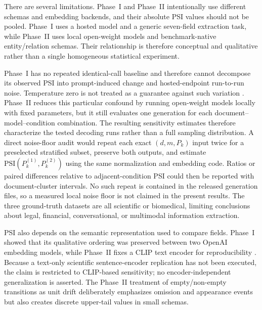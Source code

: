 \documentclass[fleqn,10pt]{wlscirep-authoryear}
\begin{document}
There are several limitations. Phase~I and Phase~II intentionally use different
schemas and embedding backends, and their absolute PSI values should not be pooled.
Phase~I uses a hosted model and a generic seven-field extraction task, while
Phase~II uses local open-weight models and benchmark-native entity/relation
schemas. Their relationship is therefore conceptual and qualitative rather than a
single homogeneous statistical experiment.

Phase~I has no repeated identical-call baseline and therefore cannot decompose its
observed PSI into prompt-induced change and hosted-endpoint run-to-run noise.
Temperature zero is not treated as a guarantee against such variation
\cite{atil2025nondeterminism}. Phase~II reduces this particular confound by
running open-weight models locally with fixed parameters, but it still evaluates
one generation for each document--model--condition combination. The resulting
sensitivity estimates therefore characterize the tested decoding runs rather than
a full sampling distribution. %
A direct noise-floor audit would repeat each exact \((d,m,P_k)\) input twice
for a preselected stratified subset, preserve both outputs, and estimate
\(\mathrm{PSI}(P_k^{(1)},P_k^{(2)})\) using the same normalization and
embedding code. Ratios or paired differences relative to adjacent-condition
PSI could then be reported with document-cluster intervals. No such repeat
is contained in the released generation files, so a measured local noise
floor is not claimed in the present results. The three
ground-truth datasets are all scientific or biomedical, limiting conclusions about
legal, financial, conversational, or multimodal information extraction.

PSI also depends on the semantic representation used to compare fields. Phase~I
showed that its qualitative ordering was preserved between two OpenAI embedding
models, while Phase~II fixes a CLIP text encoder for reproducibility
\cite{radford2021clip}.
Because a text-only scientific sentence-encoder replication has not been
executed, the claim is restricted to CLIP-based sensitivity; no
encoder-independent generalization is asserted. The Phase~II treatment of empty/non-empty transitions as
unit drift deliberately emphasizes omission and appearance events but also creates
discrete upper-tail values in small schemas.
\end{document}
